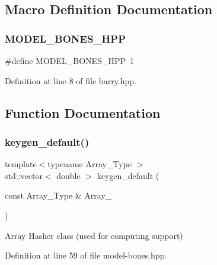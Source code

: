 \subsection{Macro Definition Documentation}
\mbox{\label{barry_8hpp_a96ab9fc3cc62974a71e056d8d86a83e1}} 
\subsubsection{\texorpdfstring{M\+O\+D\+E\+L\+\_\+\+B\+O\+N\+E\+S\+\_\+\+H\+PP}{MODEL\_BONES\_HPP}}
{\footnotesize\ttfamily \#define M\+O\+D\+E\+L\+\_\+\+B\+O\+N\+E\+S\+\_\+\+H\+PP~1}



Definition at line 8 of file barry.\+hpp.



\subsection{Function Documentation}
\mbox{\label{model-bones_8hpp_ac8a92bc92bfb721602c0470f3efa4f84}} 
\subsubsection{\texorpdfstring{keygen\+\_\+default()}{keygen\_default()}}
{\footnotesize\ttfamily template$<$typename Array\+\_\+\+Type $>$ \\
std\+::vector$<$ double $>$ keygen\+\_\+default (\begin{DoxyParamCaption}\item[{const Array\+\_\+\+Type \&}]{Array\+\_\+ }\end{DoxyParamCaption})\hspace{0.3cm}{\ttfamily [inline]}}



Array Hasher class (used for computing support) 



Definition at line 59 of file model-\/bones.\+hpp.

